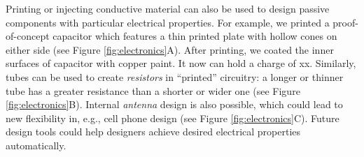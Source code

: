 Printing or injecting conductive material can also be used to design passive components with particular electrical properties. For example, we printed a proof-of-concept  capacitor which features a thin printed plate with hollow cones on either side (see Figure \ref{fig:electronics}A).  After printing, we coated the inner surfaces of capacitor with copper paint.  It now can hold a charge of xx.  Similarly, tubes can be used to create \emph{resistors} in ``printed'' circuitry: a longer or thinner tube has a greater resistance than a shorter or wider one (see Figure \ref{fig:electronics}B).  Internal \emph{antenna} design is also possible, which could lead to new flexibility in, e.g., cell phone design (see Figure \ref{fig:electronics}C). Future design tools could help designers achieve desired electrical properties automatically.

